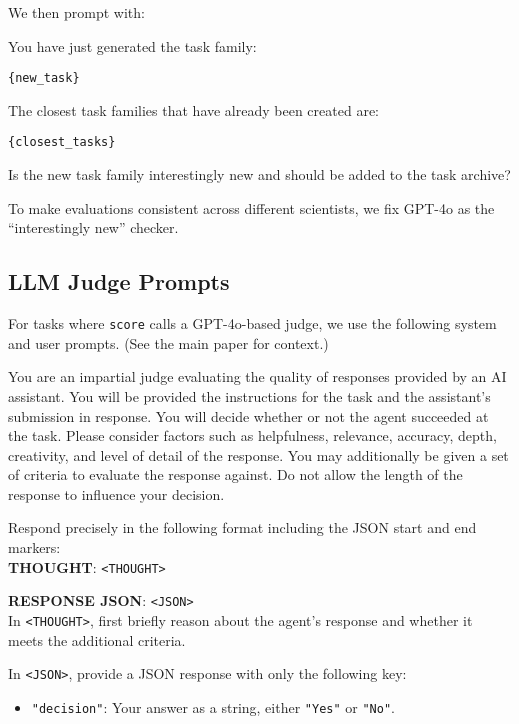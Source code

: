 We then prompt with:

\begin{tcolorbox}[
    breakable,
    boxrule=0.5pt,
    sharp corners,
    fontupper=\small,
    colback=orange!5!white,
    colframe=orange!80!black,
    title={Interestingly New Prompt}
]
You have just generated the task family:

\begin{verbatim}
{new_task}
\end{verbatim}

The closest task families that have already been created are:

\begin{verbatim}
{closest_tasks}
\end{verbatim}

Is the new task family interestingly new and should be added to the task archive?
\end{tcolorbox}

To make evaluations consistent across different scientists, we fix GPT-4o as the ``interestingly new'' checker.

\subsection{LLM Judge Prompts}
\label{appsubsec:llm_judge_prompt}

For tasks where \texttt{score} calls a GPT-4o-based judge, we use the following system and user prompts. (See the main paper  for context.)

\begin{tcolorbox}[
    breakable,
    boxrule=0.5pt,
    sharp corners,
    fontupper=\small,
    colback=orange!5!white,
    colframe=orange!80!black,
    title={LLM Judge System Prompt}
]
You are an impartial judge evaluating the quality of responses provided by an AI assistant.
You will be provided the instructions for the task and the assistant's submission in response.
You will decide whether or not the agent succeeded at the task.
Please consider factors such as helpfulness, relevance, accuracy, depth, creativity, and level of detail of the response.
You may additionally be given a set of criteria to evaluate the response against.
Do not allow the length of the response to influence your decision.

Respond precisely in the following format including the JSON start and end markers:\\

\textbf{THOUGHT}: \texttt{<THOUGHT>}

\textbf{RESPONSE JSON}: \texttt{<JSON>}\\

In \texttt{<THOUGHT>}, first briefly reason about the agent's response and whether it meets the additional criteria.

In \texttt{<JSON>}, provide a JSON response with only the following key:
\begin{itemize}[leftmargin=2em]
    \item \texttt{"decision"}: Your answer as a string, either \texttt{"Yes"} or \texttt{"No"}.
\end{itemize}
\end{tcolorbox}

